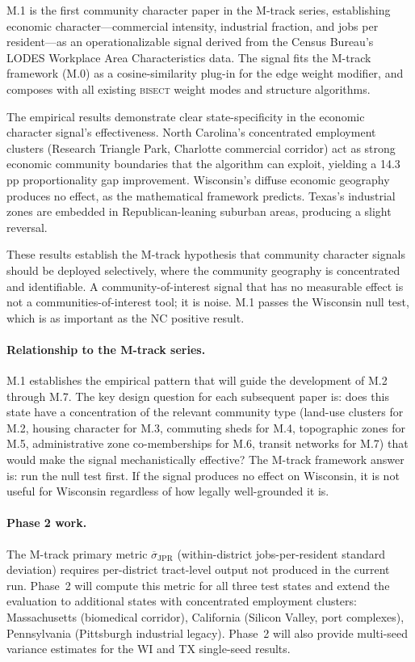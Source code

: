 \label{sec:conclusion}

M.1 is the first community character paper in the M-track series, establishing
economic character---commercial intensity, industrial fraction, and jobs per
resident---as an operationalizable signal derived from the Census Bureau's
LODES Workplace Area Characteristics data.
The signal fits the M-track framework (M.0) as a cosine-similarity plug-in
for the edge weight modifier, and composes with all existing \textsc{bisect}
weight modes and structure algorithms.

The empirical results demonstrate clear state-specificity in the economic
character signal's effectiveness.
North Carolina's concentrated employment clusters (Research Triangle Park,
Charlotte commercial corridor) act as strong economic community boundaries
that the algorithm can exploit, yielding a 14.3\,pp proportionality gap
improvement.
Wisconsin's diffuse economic geography produces no effect, as the mathematical
framework predicts.
Texas's industrial zones are embedded in Republican-leaning suburban areas,
producing a slight reversal.

These results establish the M-track hypothesis that community character
signals should be deployed selectively, where the community geography is
concentrated and identifiable.
A community-of-interest signal that has no measurable effect is not a
communities-of-interest tool; it is noise.
M.1 passes the Wisconsin null test, which is as important as the NC
positive result.

\paragraph{Relationship to the M-track series.}
M.1 establishes the empirical pattern that will guide the development of
M.2 through M.7.
The key design question for each subsequent paper is:
does this state have a concentration of the relevant community type
(land-use clusters for M.2, housing character for M.3, commuting sheds for M.4,
topographic zones for M.5, administrative zone co-memberships for M.6,
transit networks for M.7) that would make the signal mechanistically effective?
The M-track framework answer is: run the null test first.
If the signal produces no effect on Wisconsin, it is not useful for Wisconsin
regardless of how legally well-grounded it is.

\paragraph{Phase 2 work.}
The M-track primary metric $\overline{\sigma}_{\mathrm{JPR}}$ (within-district
jobs-per-resident standard deviation) requires per-district tract-level output
not produced in the current run.
Phase~2 will compute this metric for all three test states and extend the
evaluation to additional states with concentrated employment clusters:
Massachusetts (biomedical corridor), California (Silicon Valley, port
complexes), Pennsylvania (Pittsburgh industrial legacy).
Phase~2 will also provide multi-seed variance estimates for the WI and TX
single-seed results.

